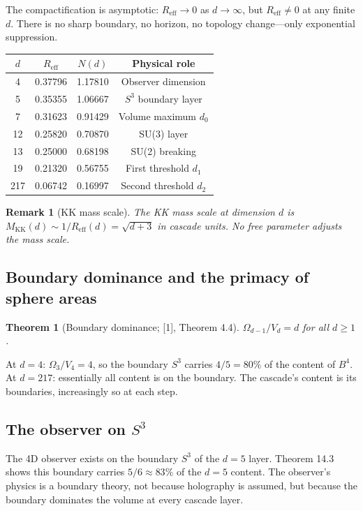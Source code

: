 \documentclass[12pt,a4paper]{article}
\newtheorem{theorem}{Theorem}[section]
\newtheorem*{remark}{Remark}
\begin{document}
The compactification is asymptotic: $R_{\text{eff}} \to 0$ as $d \to \infty$, but $R_{\text{eff}} \neq 0$ at any finite $d$.
There is no sharp boundary, no horizon, no topology change---only exponential suppression.

\begin{center}
\begin{tabular}{cccc}
\hline
$d$ & $R_{\text{eff}}$ & $N(d)$ & Physical role \\
\hline
4 & 0.37796 & 1.17810 & Observer dimension \\
5 & 0.35355 & 1.06667 & $S^3$ boundary layer \\
7 & 0.31623 & 0.91429 & Volume maximum $d_0$ \\
12 & 0.25820 & 0.70870 & SU(3) layer \\
13 & 0.25000 & 0.68198 & SU(2) breaking \\
19 & 0.21320 & 0.56755 & First threshold $d_1$ \\
217 & 0.06742 & 0.16997 & Second threshold $d_2$ \\
\hline
\end{tabular}
\end{center}

\begin{remark}[KK mass scale]
The KK mass scale at dimension $d$ is $M_{\text{KK}}(d) \sim
1/R_{\text{eff}}(d) = \sqrt{d + 3}$ in cascade units. No free parameter adjusts the mass scale.
\end{remark}

\subsection{Boundary dominance and the primacy of sphere areas}

\begin{theorem}[Boundary dominance; {[1]}, Theorem 4.4]
$\Omega_{d-1}/V_d = d$ for all $d \geq 1$.
\end{theorem}

At $d = 4$: $\Omega_3/V_4 = 4$, so the boundary $S^3$ carries $4/5 = 80\%$ of the content of $B^4$. At
$d = 217$: essentially all content is on the boundary. The cascade's content is its boundaries,
increasingly so at each step.

\subsection{The observer on $S^3$}

The 4D observer exists on the boundary $S^3$ of the $d = 5$ layer. Theorem 14.3 shows this
boundary carries $5/6 \approx 83\%$ of the $d = 5$ content. The observer's physics is a boundary
theory, not because holography is assumed, but because the boundary dominates the
volume at every cascade layer.
\end{document}

